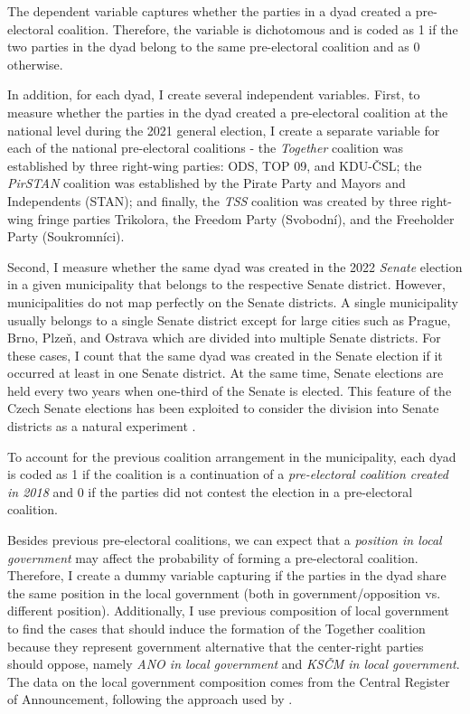 \documentclass[]{interact}
\theoremstyle{plain}%
\theoremstyle{definition}
\theoremstyle{remark}
\begin{document}
The dependent variable captures whether the parties in a dyad created a pre-electoral coalition. Therefore, the variable is dichotomous and is coded as 1 if the two parties in the dyad belong to the same pre-electoral coalition and as 0 otherwise. 

In addition, for each dyad, I create several independent variables. 
First, to measure whether the parties in the dyad created a pre-electoral coalition at the national level during the 2021 general election, I create a separate variable for each of the national pre-electoral coalitions - the \emph{Together} coalition was established by three right-wing parties: ODS, TOP 09, and KDU-ČSL; the \emph{PirSTAN} coalition was established by the Pirate Party and Mayors and Independents (STAN); and finally, the \emph{TSS} coalition was created by three right-wing fringe parties Trikolora, the Freedom Party (Svobodní), and the Freeholder Party (Soukromníci). 

Second, I measure whether the same dyad was created in the 2022 \emph{Senate} election in a given municipality that belongs to the respective Senate district. However, municipalities do not map perfectly on the Senate districts. A single municipality usually belongs to a single Senate district except for large cities such as Prague, Brno, Plzeň, and Ostrava which are divided into multiple Senate districts. For these cases, I count that the same dyad was created in the Senate election if it occurred at least in one Senate district. At the same time, Senate elections are held every two years when one-third of the Senate is elected. This feature of the Czech Senate elections has been exploited to consider the division into Senate districts as a natural experiment \citep[cf.][]{roberts2018,lysek2022}. 

To account for the previous coalition arrangement in the municipality, each dyad is coded as 1 if the coalition is a continuation of a \emph{pre-electoral coalition created in 2018} and 0 if the parties did not contest the election in a pre-electoral coalition. 

Besides previous pre-electoral coalitions, we can expect that a \emph{position in local government} may affect the probability of forming a pre-electoral coalition. Therefore, I create a dummy variable capturing if the parties in the dyad share the same position in the local government (both in government/opposition vs. different position). Additionally, I use previous composition of local government to find the cases that should induce the formation of the Together coalition because they represent government alternative that the center-right parties should oppose, namely \emph{ANO in local government} and \emph{KSČM in local government}. 
The data on the local government composition comes from the Central Register of Announcement, following the approach used by \citet{skvrnak2021}.
\end{document}
